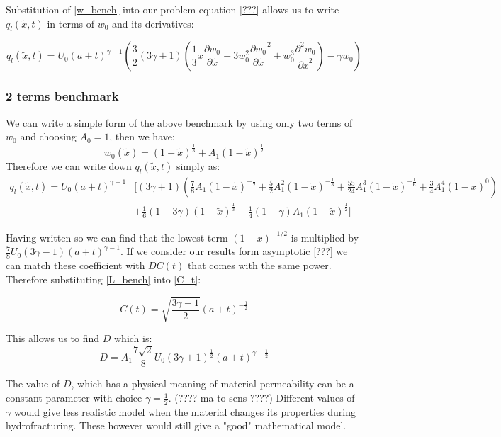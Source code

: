 Substitution of \eqref{w_bench} into our problem equation \eqref{???} allows us to write $q_l(\tilde x,t)$ in terms of $w_0$ and its derivatives:

\begin{equation}\label{q_l_bench}
q_l(\tilde x,t)=U_0(a+t)^{\gamma-1}\left(\frac{3}{2}(3\gamma+1)\left(\frac{1}{3}x\frac{\partial w_0}{\partial \tilde x}+3w_0^2\frac{\partial w_0}{\partial \tilde x}^2+w_0^3\frac{\partial^2 w_0}{\partial \tilde x^2}\right)-\gamma w_0\right)
\end{equation}

\subsubsection{2 terms benchmark}
We can write a simple form of the above benchmark by using only two terms of $w_0$ and choosing $A_0=1$, then we have:
\begin{equation}\label{w_2_bench}
w_0(\tilde x)=(1-\tilde x)^{\frac{1}{3}}+A_1(1-\tilde x)^{\frac{1}{2}}
\end{equation}
Therefore we can write down $q_l(\tilde x,t)$ simply as:
\begin{align}\label{q_l_2_bench}
q_l(\tilde x,t)=U_0(a+t)^{\gamma-1}&\Bigg[(3\gamma+1)\left(\frac{7}{8}A_1(1-\tilde x)^{-\frac{1}{2}}+\frac{5}{2}A_1^2(1-\tilde x)^{-\frac{1}{3}}+\frac{55}{24}A_1^3(1-\tilde x)^{-\frac{1}{6}}+\frac{3}{4}A_1^4(1-\tilde x)^{0}\right)
 \nonumber \\
&+\frac{1}{6}(1-3\gamma)(1-\tilde x)^{\frac{1}{3}}+\frac{1}{4}(1-\gamma)A_1(1-\tilde x)^{\frac{1}{2}}\Bigg]
\end{align}

Having written so we can find that the lowest term $(1-x)^{-1/2}$ is multiplied by $\frac{7}{8}U_0(3\gamma-1)(a+t)^{\gamma -1}$. If we consider our results form asymptotic \eqref{???} we can match these coefficient with $DC(t)$ that comes with the same power. Therefore substituting \eqref{L_bench} into \eqref{C_t}:

\begin{equation}\label{C_t_bench}
C(t)=\sqrt{\frac{3\gamma+1}{2}}(a+t)^{-\frac{1}{2}}
\end{equation}

This allows us to find $D$ which is:
\begin{equation}\label{D_bench}
D=A_1\frac{7\sqrt{2}}{8}U_0(3\gamma+1)^{\frac{1}{2}}(a+t)^{\gamma-\frac{1}{2}}
\end{equation}

The value of $D$, which has a physical meaning of material permeability can be a constant parameter with choice $\gamma =\frac{1}{2}$. (???? ma to sens ????) Different values of $\gamma$ 
would give less realistic model when the material changes its properties during hydrofracturing. These however would still give a "good" mathematical model.


